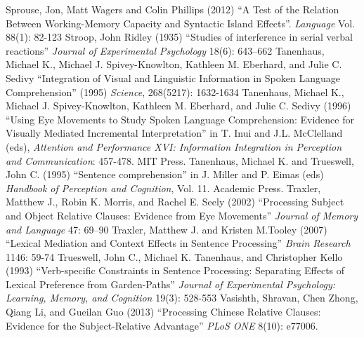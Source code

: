 \documentclass[a4paper]{article}
\begin{document}
\newline
Sprouse, Jon, Matt Wagers and Colin Phillips (2012) ``A Test of the Relation Between Working-Memory Capacity and Syntactic Island Effects''.  {\it Language}  Vol. 88(1): 82-123
\newline
\newline
Stroop, John Ridley (1935) ``Studies of interference in serial verbal reactions'' {\it Journal of Experimental Psychology} 18(6): 643–662
\newline
\newline
Tanenhaus, Michael K., Michael J. Spivey-Knowlton, Kathleen M. Eberhard, and Julie C. Sedivy
``Integration of Visual and Linguistic Information in Spoken Language Comprehension''  (1995)
{\it Science}, 268(5217): 1632-1634
\newline
\newline
Tanenhaus, Michael K., Michael J. Spivey-Knowlton, Kathleen M. Eberhard, and Julie C. Sedivy (1996)  ``Using Eye Movements to Study Spoken Language Comprehension:  Evidence for Visually Mediated Incremental Interpretation''  in T. Inui and J.L. McClelland (eds), {\it Attention and Performance XVI:  Information Integration in Perception and Communication}: 457-478. MIT Press. 
\newline
\newline
Tanenhaus, Michael K. and Trueswell, John C. (1995)  ``Sentence comprehension'' in J. Miller and P. Eimas (eds) {\it Handbook of Perception and Cognition}, Vol. 11.  Academic Press.
\newline
\newline
Traxler, Matthew J., Robin K. Morris, and Rachel E. Seely (2002) ``Processing Subject and Object Relative Clauses: 
Evidence from Eye Movements'' {\it Journal of Memory and Language} 47: 69–90 
\newline
\newline
Traxler, Matthew J. and Kristen M.Tooley (2007) ``Lexical Mediation and Context Effects in Sentence Processing''  {\it Brain Research}
1146: 59-74
\newline
\newline
Trueswell, John C., Michael K. Tanenhaus, and Christopher Kello (1993) ``Verb-specific Constraints in Sentence Processing: Separating Effects of Lexical Preference from Garden-Paths'' {\it Journal of Experimental Psychology: Learning, Memory, and Cognition} 19(3): 528-553
\newline
\newline
Vasishth, Shravan, Chen Zhong, Qiang Li, and Gueilan Guo (2013) ``Processing Chinese Relative Clauses: Evidence for the Subject-Relative Advantage'' {\it PLoS ONE} 8(10): e77006.
\end{document}
